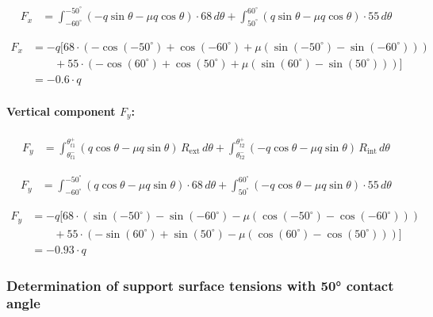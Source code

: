 \documentclass[12pt]{article}
\begin{document}
\begin{align*}
F_x &=
\int_{-60^\circ}^{-50^\circ} (-q \sin\theta - \mu q \cos\theta) \cdot 68 \, d\theta
+
\int_{50^\circ}^{60^\circ} (q \sin\theta - \mu q \cos\theta) \cdot 55 \, d\theta
\end{align*}

\begin{equation}
\begin{aligned}
F_x &= -q \Big[
68 \cdot \left( 
    -\cos(-50^\circ) + \cos(-60^\circ) 
    + \mu \left( \sin(-50^\circ) - \sin(-60^\circ) \right)
\right) \\
&\qquad + 
55 \cdot \left( 
    -\cos(60^\circ) + \cos(50^\circ) 
    + \mu \left( \sin(60^\circ) - \sin(50^\circ) \right)
\right)
\Big] \\
&= \boxed{-0.6 \cdot q}
\end{aligned}
\tag{2.26}
\end{equation}

\paragraph{Vertical component \( F_y \):}
\begin{align}
F_y &=
\int_{\theta_{t1}^-}^{\theta_{t1}^+} (q \cos\theta - \mu q \sin\theta) \, R_{\text{ext}} \, d\theta
+
\int_{\theta_{t2}^-}^{\theta_{t2}^+} (-q \cos\theta - \mu q \sin\theta) \, R_{\text{int}} \, d\theta
\tag{2.27}
\end{align}

\begin{align*}
F_y &=
\int_{-60^\circ}^{-50^\circ} (q \cos\theta - \mu q \sin\theta) \cdot 68 \, d\theta
+
\int_{50^\circ}^{60^\circ} (-q \cos\theta - \mu q \sin\theta) \cdot 55 \, d\theta
\end{align*}

\begin{equation}
\begin{aligned}
F_y &= -q \Big[
68 \cdot \left( 
    \sin(-50^\circ) - \sin(-60^\circ)
    - \mu \left( \cos(-50^\circ) - \cos(-60^\circ) \right)
\right) \\
&\qquad + 
55 \cdot \left( 
    -\sin(60^\circ) + \sin(50^\circ)
    - \mu \left( \cos(60^\circ) - \cos(50^\circ) \right)
\right)
\Big] \\
&= \boxed{-0.93 \cdot q}
\end{aligned}
\tag{2.28}
\end{equation}

\subsubsection{Determination of support surface tensions with 50° contact angle}
\end{document}
